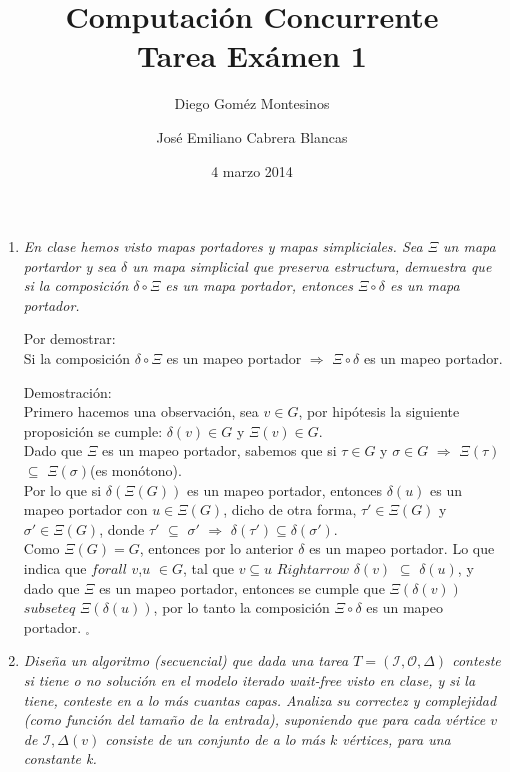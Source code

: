 \documentclass{article}
\title{Computación Concurrente \\ \Large{Tarea Exámen 1}}
\author{
  Diego Goméz Montesinos
  \and
  José Emiliano Cabrera Blancas
  }
\date{4 marzo 2014}
\begin{document}
\maketitle
\begin{enumerate}
  
\item{
    \textsl{
      En clase hemos visto mapas portadores y mapas simpliciales. Sea $\Xi$ un
      mapa portardor y sea $\delta$ un mapa simplicial que preserva estructura,
      demuestra que si la composición $\delta \circ \Xi$ es un mapa portador, 
      entonces $\Xi \circ \delta$ es un mapa portador.\\
    }
    
    Por demostrar:\\
    Si la composición $\delta \circ \Xi$ es un mapeo portador $\Rightarrow$ 
    $\Xi \circ \delta$ es un mapeo portador.
    
    Demostración:\\
    Primero hacemos una observación, sea $v \in G$, por hipótesis la siguiente 
    proposición se cumple: $\delta(v) \in G$ y $\Xi(v) \in G$.\\
    Dado que $\Xi$ es un mapeo portador, sabemos que si $\tau \in G$ y 
    $\sigma \in G$ $\Rightarrow$ $\Xi(\tau)$ $\subseteq$ $\Xi(\sigma)$(es monótono).\\
    Por lo que si $\delta(\Xi(G))$ es un mapeo portador, entonces $\delta(u)$ es un
    mapeo portador con $u \in \Xi(G)$, dicho de otra forma, $\tau' \in \Xi(G)$ y 
    $\sigma' \in \Xi(G)$, donde $\tau'$ $\subseteq$ $\sigma'$ $\Rightarrow$ $\delta(\tau') 
    \subseteq \delta(\sigma')$.\\
    Como $\Xi(G) = G$, entonces por lo anterior $\delta$ es un mapeo portador.
    Lo que indica que $forall$ $v$,$u$ $\in G$, tal que $v \subseteq u$ $Rightarrow$ 
    $\delta(v)$ $\subseteq$ $\delta(u)$, y dado que $\Xi$ es un mapeo portador, entonces
    se cumple que $\Xi(\delta(v))$ $subseteq$ $\Xi(\delta(u))$, por lo tanto la composición
    $\Xi \circ \delta$ es un mapeo portador. $_\square$\\
        
  }
  
\item{
    \textsl{ 
      Diseña un algoritmo (secuencial) que dada una tarea $T = (\mathcal{I},\mathcal{O},\Delta)$
      conteste si tiene o no solución en el modelo iterado wait-free visto en clase, y si la tiene,
      conteste en a lo más cuantas capas. Analiza su correctez y complejidad (como función del tamaño
      de la entrada), suponiendo que para cada vértice $v$ de $\mathcal{I},\Delta(v)$ consiste de 
      un conjunto de a lo más $k$ vértices, para una constante k.\\
    }

}
\end{enumerate}
\end{document}
